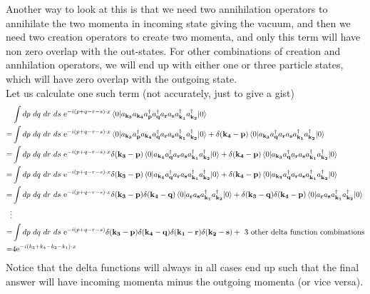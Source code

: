 \documentclass[11pt]{article}
\newcommand{\e}{\mathrm{e}}
\renewcommand{\a}[1]{a_\mathbf{#1}}
\newcommand{\adag}[1]{a^\dagger_\mathbf{#1}}
\numberwithin{equation}{section}
\begin{document}
{        Another way to look at this is that we need two annihilation operators to annihilate the two momenta in incoming state giving the vacuum, and then we need two creation operators to create two momenta, and only this term will have non zero overlap with the out-states. For other combinations of creation and annhilation operators, we will end up with either one or three particle states, which will have zero overlap with the outgoing state.\vspace{7pt}\\
        Let us calculate one such term (not accurately, just to give a gist)
        \begin{align*}
            &\int dp~dq~dr~ds~ \e^{-i(p+q-r-s)\cdot x}\braket{0|\a{k_3}\a{k_4} \adag{p}\adag{q}\a{r}\a{s} \adag{k_1} \adag{k_2}|0} \\
            =&\int dp~dq~dr~ds~ \e^{-i(p+q-r-s)\cdot x}\braket{0|\a{k_3} \adag{p}\a{k_4}\adag{q}\a{r}\a{s} \adag{k_1} \adag{k_2}|0} + \delta(\mathbf{k_4} - \textbf{p})\braket{0|\a{k_3} \adag{q}\a{r}\a{s} \adag{k_1} \adag{k_2}|0}\\
            =& \int dp~dq~dr~ds~ \e^{-i(p+q-r-s)\cdot x}\delta(\mathbf{k_3} - \textbf{p})\braket{0|\a{k_4}\adag{q}\a{r}\a{s} \adag{k_1} \adag{k_2}|0} + \delta(\mathbf{k_4} - \textbf{p})\braket{0|\a{k_3} \adag{q}\a{r}\a{s} \adag{k_1} \adag{k_2}|0}\\
            =&  \int dp~dq~dr~ds~ \e^{-i(p+q-r-s)\cdot x}\delta(\mathbf{k_3} - \textbf{p})\braket{0|\a{k_4}\adag{q}\a{r}\a{s} \adag{k_1} \adag{k_2}|0} + \delta(\mathbf{k_4} - \textbf{p})\braket{0|\a{k_3} \adag{q}\a{r}\a{s} \adag{k_1} \adag{k_2}|0}\\
            =& \int dp~dq~dr~ds~ \e^{-i(p+q-r-s)\cdot x}\delta(\mathbf{k_3} - \textbf{p})\delta(\mathbf{k_4} - \textbf{q})\braket{0|\a{r}\a{s} \adag{k_1} \adag{k_2}|0} + \delta(\mathbf{k_3} - \textbf{q})\delta(\mathbf{k_4} - \textbf{p})\braket{0|\a{r}\a{s} \adag{k_1} \adag{k_2}|0}\\
            \vdots \\
            =& \int dp~dq~dr~ds~ \e^{-i(p+q-r-s)} \delta(\mathbf{k_3} - \textbf{p})\delta(\mathbf{k_4} - \textbf{q})\delta(\mathbf{k_1} - \textbf{r})\delta(\mathbf{k_2} - \textbf{s}) + \text{~3 other delta function combinations}\\
            =& 4 \e^{-i(k_3 + k_4 - k_2 - k_1)\cdot x}
        \end{align*}
        Notice that the delta functions will always in all cases end up such that the final answer will have incoming momenta minus the outgoing momenta (or vice versa). \\
}
\end{document}

